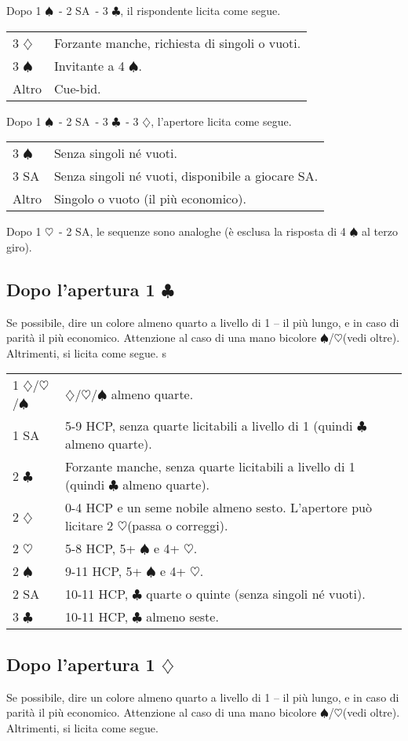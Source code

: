 \documentclass[a4paper,10pt]{article}
\renewcommand{\c}{$\clubsuit$\xspace}
\renewcommand{\d}{$\diamondsuit$\xspace}
\newcommand{\h}{$\heartsuit$\xspace}
\newcommand{\s}{$\spadesuit$\xspace}
\newcommand{\sa}{SA\xspace}
\newcommand{\smallspace}{\vskip0.3cm}
\newenvironment{twocol}
  {\smallspace\noindent\begin{tabular}{l p{0.78\textwidth}}}
  {\end{tabular}\smallspace}
\begin{document}
Dopo 1 \s\ - 2 \sa\ - 3 \c, il rispondente licita come segue.
\begin{twocol}
  3 \d & Forzante manche, richiesta di singoli o vuoti.\\
  3 \s & Invitante a 4 \s.\\
  Altro & Cue-bid.
\end{twocol}

Dopo 1 \s\ - 2 \sa\ - 3 \c\ - 3 \d, l'apertore licita come segue.
\begin{twocol}
  3 \s & Senza singoli né vuoti.\\
  3 \sa & Senza singoli né vuoti, disponibile a giocare \sa.\\
  Altro & Singolo o vuoto (il più economico).
\end{twocol}

Dopo 1 \h\ - 2 \sa, le sequenze sono analoghe (è esclusa la risposta di 4 \s al terzo giro). 


\subsection{Dopo l'apertura 1 \c}

Se possibile, dire un colore almeno quarto a livello di 1 -- il più lungo, e in caso di parità il più economico. Attenzione al caso di una mano bicolore \s/\h (vedi oltre). Altrimenti, si licita come segue.
s
\begin{twocol}
  1 \d/\h/\s & \d/\h/\s almeno quarte.\\
  1 \sa & 5-9 HCP, senza quarte licitabili a livello di 1 (quindi \c almeno quarte). \\
  2 \c & Forzante manche, senza quarte licitabili a livello di 1 (quindi \c almeno quarte). \\
  2 \d & 0-4 HCP e un seme nobile almeno sesto. L'apertore può licitare 2 \h (passa o correggi). \\
  2 \h & 5-8 HCP, 5+ \s e 4+ \h. \\
  2 \s & 9-11 HCP, 5+ \s e 4+ \h. \\
  2 \sa & 10-11 HCP, \c quarte o quinte (senza singoli né vuoti).\\
  3 \c & 10-11 HCP, \c almeno seste.
\end{twocol}


\subsection{Dopo l'apertura 1 \d}

Se possibile, dire un colore almeno quarto a livello di 1 -- il più lungo, e in caso di parità il più economico. Attenzione al caso di una mano bicolore \s/\h (vedi oltre). Altrimenti, si licita come segue.
\end{document}
